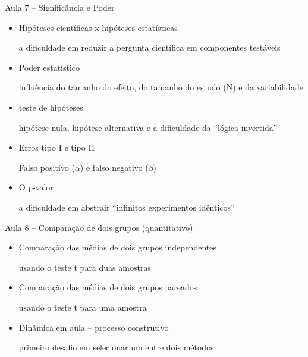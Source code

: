 \documentclass{beamer}
\begin{document}
\begin{frame}{\scriptsize Aula 7 -- Significância e Poder}
  \begin{itemize}
    \footnotesize
  \item Hipóteses científicas x hipóteses estatísticas

    {\tiny a dificuldade em reduzir a pergunta científica em componentes testáveis}
    \bigskip
  \item Poder estatístico

    {\tiny influência do tamanho do efeito, do tamanho do estudo (N) e da variabilidade}
    \bigskip
  \item teste de hipóteses

    {\tiny hipótese nula, hipótese alternativa e a dificuldade da ``lógica invertida''}
    \bigskip
  \item Erros tipo I e tipo II

    {\tiny Falso positivo ($\alpha$) e falso negativo ($\beta$)}
    \bigskip
  \item O p-valor

    {\tiny a dificuldade em abstrair ``infinitos experimentos idênticos''}
  \end{itemize}
\end{frame}

\begin{frame}{\scriptsize Aula 8 -- Comparação de dois grupos (quantitativo)}
  \begin{itemize}
    \footnotesize
  \item Comparação das médias de dois grupos independentes

    {\tiny usando o teste t para duas amostras}
    \bigskip
  \item Comparação das médias de dois grupos pareados

    {\tiny usando o teste t para uma amostra}
    \bigskip
  \item Dinâmica em aula -- processo construtivo

    {\tiny primeiro desafio em selecionar um entre dois métodos}
    \bigskip
  \end{itemize}
\end{frame}
\end{document}
